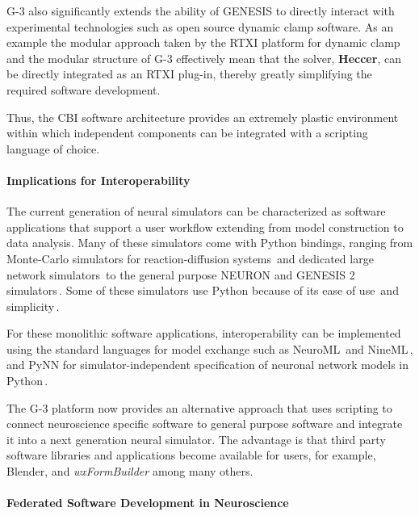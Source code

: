 \documentclass[12pt]{article}
\begin{document}
G-3 also significantly extends the ability of GENESIS to directly
interact with experimental technologies such as open source dynamic
clamp software.  As an example the modular approach taken by the RTXI
platform for dynamic
clamp\,\cite{bettencourt08:_effec_imper_dynam_clamp, dorval01:_real}
and the modular structure of G-3 effectively mean that the solver,
{\bf Heccer}, can be directly integrated as an RTXI plug-in, thereby
greatly simplifying the required software development.

Thus, the CBI software architecture provides an extremely plastic
environment within which independent components can be integrated with
a scripting language of choice.


\paragraph{Implications for Interoperability}

The current generation of neural simulators can be characterized as
software applications that support a user workflow extending from
model construction to data analysis.  Many of these simulators come
with Python bindings, ranging from Monte-Carlo simulators for
reaction-diffusion systems\,\cite{wils09:_steps} and dedicated large
network simulators\,\cite{eppler08:_pynes} to the general purpose
NEURON and GENESIS 2 simulators\,\cite{hines09:_neuron_python,
  bower98:_book_genes}.  Some of these simulators use Python because
of its ease of use\,\cite{pecevski09:_pcsim} and
simplicity\,\cite{goodman08:_brian}.

For these monolithic software applications, interoperability can be
implemented using the standard languages for model exchange such as
NeuroML\,\cite{nigel01:_towar_neurom} and
NineML\,\cite{gortechnikov10:_ninem_user_layer}, and PyNN for
simulator-independent specification of neuronal network models in
Python\,\cite{andrew08:_pynn}.

The G-3 platform now provides an alternative approach that uses
scripting to connect neuroscience specific software to general purpose
software and integrate it into a next generation neural simulator.
The advantage is that third party software libraries and applications
become available for users, for example, Blender, and {\it
  wxFormBuilder} among many others.


\paragraph{Federated Software Development in Neuroscience}
\end{document}
